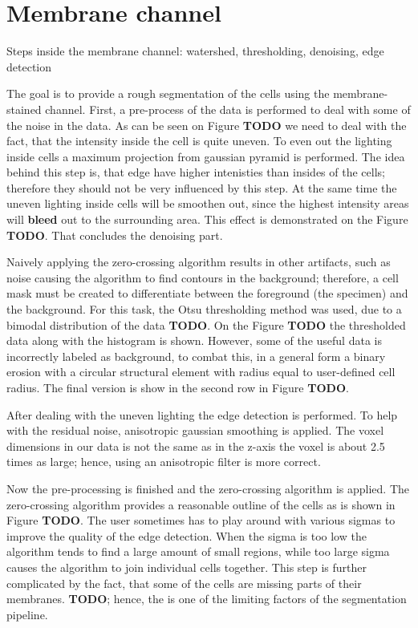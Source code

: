 \documentclass[
  digital,     %
  oneside,     %
  nosansbold,  %
  nocolorbold, %
  lof,         %
  lot,         %
]{fithesis4}
\begin{document}
\section{Membrane channel}
Steps inside the membrane channel: watershed, thresholding, denoising, edge
detection

The goal is to provide a rough segmentation of the cells using the
membrane-stained channel. First, a pre-process of the data is performed to deal
with some of the noise in the data. As can be seen on Figure \textbf{TODO} we
need to deal with the fact, that the intensity inside the cell is quite uneven.
To even out the lighting inside cells a maximum projection from gaussian pyramid
is performed. The idea behind this step is, that edge have higher intenisties
than insides of the cells; therefore they should not be very influenced by this
step. At the same time the uneven lighting inside cells will be smoothen out,
since the highest intensity areas will \textbf{bleed} out to the surrounding
area. This effect is demonstrated on the Figure \textbf{TODO}. That concludes
the denoising part.

Naively applying the zero-crossing algorithm results in other artifacts, such
as noise causing the algorithm to find contours in the background; therefore,
a cell mask must be created to differentiate between the foreground (the
specimen) and the background. For this task, the Otsu thresholding method was
used, due to a bimodal distribution of the data \textbf{TODO}. On the Figure
\textbf{TODO} the thresholded data along with the histogram is shown. However,
some of the useful data is incorrectly labeled as background, to combat this, in
a general form a binary erosion with a circular structural element with radius
equal to user-defined cell radius. The final version is show in the second row
in Figure \textbf{TODO}.

After dealing with the uneven lighting the edge detection is performed. To help
with the residual noise, anisotropic gaussian smoothing is applied. The voxel
dimensions in our data is not the same as in the z-axis the voxel is about 2.5
times as large; hence, using an anisotropic filter is more correct. 

Now the pre-processing is finished and the zero-crossing algorithm is applied.
The zero-crossing algorithm provides a reasonable outline of the cells as is
shown in Figure \textbf{TODO}. The user sometimes has to play around with
various sigmas to improve the quality of the edge detection. When the sigma is
too low the algorithm tends to find a large amount of small regions, while too
large sigma causes the algorithm to join individual cells together. This step
is further complicated by the fact, that some of the cells are missing parts of
their membranes. \textbf{TODO}; hence, the is one of the limiting factors of
the segmentation pipeline.
\end{document}

